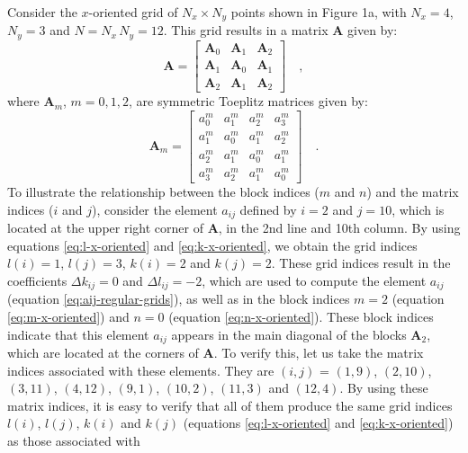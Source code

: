 \documentclass[manuscript,revised]{geophysics}
\begin{document}
Consider the $x$-oriented grid of $N_{x} \times N_{y}$ points shown in Figure 1a, 
with $N_{x} = 4$, $N_{y} = 3$ and $N = N_{x} \, N_{y} = 12$.
This grid results in a matrix $\mathbf{A}$ given by:
\begin{equation}
\mathbf{A} = \begin{bmatrix}
\mathbf{A}_{0} & \mathbf{A}_{1} & \mathbf{A}_{2} \\
\mathbf{A}_{1} & \mathbf{A}_{0} & \mathbf{A}_{1} \\
\mathbf{A}_{2} & \mathbf{A}_{1} & \mathbf{A}_{2}
\end{bmatrix} \quad ,
\label{eq:A-x-oriented-example}
\end{equation}
where $\mathbf{A}_{m}$, $m = 0, 1, 2$, are symmetric Toeplitz matrices given by:
\begin{equation}
\mathbf{A}_{m} = \begin{bmatrix}
a^{m}_{0} & a^{m}_{1} & a^{m}_{2} & a^{m}_{3} \\
a^{m}_{1} & a^{m}_{0} & a^{m}_{1} & a^{m}_{2} \\
a^{m}_{2} & a^{m}_{1} & a^{m}_{0} & a^{m}_{1} \\
a^{m}_{3} & a^{m}_{2} & a^{m}_{1} & a^{m}_{0}
\end{bmatrix} \quad .
\label{eq:Am-x-oriented}
\end{equation}
To illustrate the relationship between the block indices ($m$ and $n$) and the matrix indices 
($i$ and $j$), consider the element $a_{ij}$ defined by $i = 2$ and $j = 10$, which is
located at the upper right corner of $\mathbf{A}$, in the 2nd line and 10th column.
By using equations \ref{eq:l-x-oriented} and \ref{eq:k-x-oriented}, we obtain the 
grid indices $l(i) = 1$, $l(j) = 3$, $k(i) = 2$ and $k(j) = 2$.
These grid indices result in the coefficients $\Delta k_{ij} = 0$ and $\Delta l_{ij} = -2$,
which are used to compute the element $a_{ij}$ (equation \ref{eq:aij-regular-grids}),
as well as in the block indices $m = 2$ (equation \ref{eq:m-x-oriented}) and 
$n = 0$ (equation \ref{eq:n-x-oriented}).
These block indices indicate that this element $a_{ij}$ appears in the main diagonal
of the blocks $\mathbf{A}_{2}$, which are located at the corners of $\mathbf{A}$.
To verify this, let us take the matrix indices associated with these elements.
They are $(i, j)$ = $(1, 9)$, $(2, 10)$, $(3, 11)$, $(4, 12)$, $(9, 1)$, $(10, 2)$, 
$(11, 3)$ and $(12, 4)$. By using these matrix indices, it is easy to verify that all
of them produce the same grid indices $l(i)$, $l(j)$, $k(i)$ and $k(j)$ 
(equations \ref{eq:l-x-oriented} and \ref{eq:k-x-oriented}) as those associated with
\end{document}
